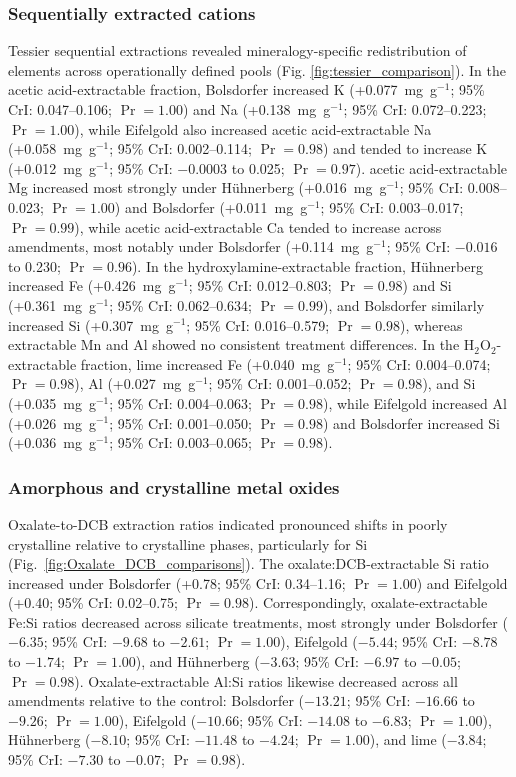 \documentclass[preprint,12pt]{elsarticle}
\begin{document}
\subsubsection{Sequentially extracted cations}
Tessier sequential extractions revealed mineralogy-specific redistribution of elements across operationally defined pools (Fig. \ref{fig:tessier_comparison}). In the acetic acid-extractable fraction, Bolsdorfer increased K (+0.077~mg~g$^{-1}$; 95\% CrI: 0.047--0.106; $\Pr = 1.00$) and Na (+0.138~mg~g$^{-1}$; 95\% CrI: 0.072--0.223; $\Pr = 1.00$), while Eifelgold also increased acetic acid-extractable Na (+0.058~mg~g$^{-1}$; 95\% CrI: 0.002--0.114; $\Pr = 0.98$) and tended to increase K (+0.012~mg~g$^{-1}$; 95\% CrI: $-0.0003$ to 0.025; $\Pr = 0.97$). acetic acid-extractable Mg increased most strongly under H\"uhnerberg (+0.016~mg~g$^{-1}$; 95\% CrI: 0.008--0.023; $\Pr = 1.00$) and Bolsdorfer (+0.011~mg~g$^{-1}$; 95\% CrI: 0.003--0.017; $\Pr = 0.99$), while acetic acid-extractable Ca tended to increase across amendments, most notably under Bolsdorfer (+0.114~mg~g$^{-1}$; 95\% CrI: $-0.016$ to 0.230; $\Pr = 0.96$). In the hydroxylamine-extractable fraction, H\"uhnerberg increased Fe (+0.426~mg~g$^{-1}$; 95\% CrI: 0.012--0.803; $\Pr = 0.98$) and Si (+0.361~mg~g$^{-1}$; 95\% CrI: 0.062--0.634; $\Pr = 0.99$), and Bolsdorfer similarly increased Si (+0.307~mg~g$^{-1}$; 95\% CrI: 0.016--0.579; $\Pr = 0.98$), whereas extractable Mn and Al showed no consistent treatment differences. In the H$_2$O$_2$-extractable fraction, lime increased Fe (+0.040~mg~g$^{-1}$; 95\% CrI: 0.004--0.074; $\Pr = 0.98$), Al (+0.027~mg~g$^{-1}$; 95\% CrI: 0.001--0.052; $\Pr = 0.98$), and Si (+0.035~mg~g$^{-1}$; 95\% CrI: 0.004--0.063; $\Pr = 0.98$), while Eifelgold increased Al (+0.026~mg~g$^{-1}$; 95\% CrI: 0.001--0.050; $\Pr = 0.98$) and Bolsdorfer increased Si (+0.036~mg~g$^{-1}$; 95\% CrI: 0.003--0.065; $\Pr = 0.98$).

\subsubsection{Amorphous and crystalline metal oxides}
Oxalate-to-DCB extraction ratios indicated pronounced shifts in poorly crystalline relative to crystalline phases, particularly for Si (Fig.~\ref{fig:Oxalate_DCB_comparisons}). The oxalate:DCB-extractable Si ratio increased under Bolsdorfer (+0.78; 95\% CrI: 0.34--1.16; $\Pr = 1.00$) and Eifelgold (+0.40; 95\% CrI: 0.02--0.75; $\Pr = 0.98$). Correspondingly, oxalate-extractable Fe:Si ratios decreased across silicate treatments, most strongly under Bolsdorfer ($-6.35$; 95\% CrI: $-9.68$ to $-2.61$; $\Pr = 1.00$), Eifelgold ($-5.44$; 95\% CrI: $-8.78$ to $-1.74$; $\Pr = 1.00$), and H\"uhnerberg ($-3.63$; 95\% CrI: $-6.97$ to $-0.05$; $\Pr = 0.98$). Oxalate-extractable Al:Si ratios likewise decreased across all amendments relative to the control: Bolsdorfer ($-13.21$; 95\% CrI: $-16.66$ to $-9.26$; $\Pr = 1.00$), Eifelgold ($-10.66$; 95\% CrI: $-14.08$ to $-6.83$; $\Pr = 1.00$), H\"uhnerberg ($-8.10$; 95\% CrI: $-11.48$ to $-4.24$; $\Pr = 1.00$), and lime ($-3.84$; 95\% CrI: $-7.30$ to $-0.07$; $\Pr = 0.98$).
\end{document}
